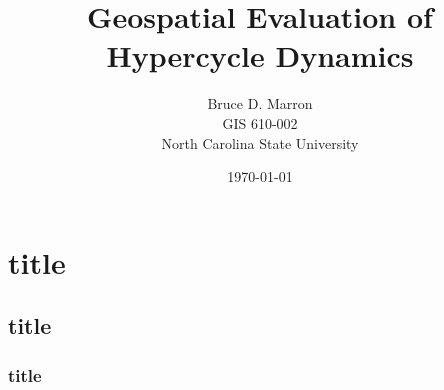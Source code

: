\documentclass[12pt, letterpaper]{article}
\title{\vspace{-15mm}\fontsize{14pt}{10pt}
                    \selectfont \textbf{Geospatial Evaluation of Hypercycle Dynamics}   %
      }
\author{
     \normalsize Bruce D. Marron \\                     %
     \normalsize GIS 610-002 \\
     \vspace{-5mm}
      \normalsize North Carolina State University      %
     \vspace{7mm}
}
\date{\normalsize \today}
\begin{document}
 
\maketitle                                      %

\section{title}
\subsection* {title}
\subsubsection*{title}                          

\autocite{karl_give_2008}
          

\printbibliography
\end{document}
